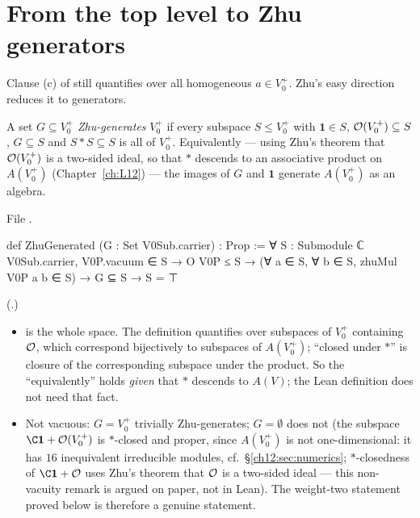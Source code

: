 \section{From the top level to Zhu generators}\label{ch12:sec:zhugen}

Clause (c) of  still quantifies over all homogeneous $a\in V_0^+$.  Zhu's easy
direction reduces it to generators.

\begin{definition}\label{ch12:def:zhugen}
A set $G\subseteq V_0^+$ \emph{Zhu-generates} $V_0^+$ if every subspace $S\le V_0^+$ with $\mathbf
1\in S$, $\mathcal{O}(V_0^+)\subseteq S$, $G\subseteq S$ and $S\ast S\subseteq S$ is all of $V_0^+$.
Equivalently --- using Zhu's theorem that $\mathcal{O}(V_0^+)$ is a two-sided ideal, so that $\ast$ descends to
an associative product on $A(V_0^+)$ (Chapter~\ref{ch:L12}) --- the images of $G$ and $\mathbf 1$ generate
$A(V_0^+)$ as an algebra.
\end{definition}
File .
\begin{leancode}
def ZhuGenerated (G : Set V0Sub.carrier) : Prop :=
  ∀ S : Submodule ℂ V0Sub.carrier, V0P.vacuum ∈ S → O V0P ≤ S →
    (∀ a ∈ S, ∀ b ∈ S, zhuMul V0P a b ∈ S) → G ⊆ S → S = ⊤
\end{leancode}
(.)
\begin{dictionary}
\begin{itemize}
\item {} is the whole space.  The definition quantifies over subspaces of $V_0^+$ containing
  $\mathcal{O}$, which correspond bijectively to subspaces of $A(V_0^+)$; ``closed under $\ast$''
  is closure of the corresponding subspace under the product.  So the ``equivalently'' holds
  \emph{given} that $\ast$ descends to $A(V)$; the Lean definition does not need that fact.
\item Not vacuous: $G=V_0^+$ trivially Zhu-generates; $G=\emptyset$ does not (the subspace
  $\C\mathbf 1+\chtwelveO(V_0^+)$ is $\ast$-closed and proper, since $A(V_0^+)$ is not
  one-dimensional: it has $16$ inequivalent irreducible modules, cf.\ \S\ref{ch12:sec:numerics};
  $\ast$-closedness of $\C\mathbf 1+\chtwelveO$ uses Zhu's theorem that $\mathcal{O}$ is a two-sided ideal ---
  this non-vacuity remark is argued on paper, not in Lean).  The weight-two statement proved below is
  therefore a genuine statement.
\end{itemize}
\end{dictionary}

